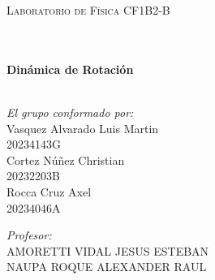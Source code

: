 \documentclass[10pt]{article}
\begin{document}
\begin{center}
\begin{minipage}{0.9\textwidth} 
\begin{center}																					%
\textsc{\LARGE  Laboratorio de Física CF1B2-B}
\end{center}
\end{minipage}\\[0.3cm]
 			\vspace*{0.4cm}																		%
\HRule \\[0.5cm]																	%
{ \huge \bfseries Din\'{a}mica de Rotaci\'{o}n}\\[0.2cm]	%
\HRule \\[0.9cm]																	%
\begin{minipage}{0.46\textwidth}													%
\begin{flushleft} \large															%

\emph{El grupo conformado por:}\\[2mm]
Vasquez Alvarado Luis Martin   \\20234143G \\[1mm]
Cortez Núñez Christian\\20232203B\\[1mm]
Rocca Cruz Axel\\20234046A\\[1mm]
 

\end{flushleft}																		%
\end{minipage}		
\begin{minipage}{0.52\textwidth}		
\vspace{-1.9cm}											%
\begin{flushright} \large															%
\emph{Profesor:}\\[2mm]																	%
AMORETTI VIDAL JESUS ESTEBAN \\ [1mm]NAUPA ROQUE ALEXANDER RAUL\\
\end{flushright}																	%
\end{minipage}	
\vspace*{1cm}
 	

\end{center}
\end{document}
